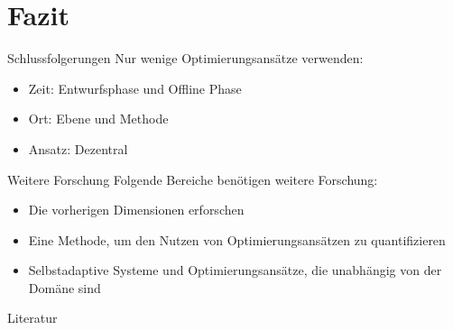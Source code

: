 \documentclass[de,16:9]{sdqbeamer}
\begin{document}
\section{Fazit}

\begin{frame}{Schlussfolgerungen}
	Nur wenige Optimierungsansätze verwenden:
	\begin{itemize}
		\item Zeit: Entwurfsphase und Offline Phase
		\item Ort: Ebene und Methode
		\item Ansatz: Dezentral
	\end{itemize}
\end{frame}

\begin{frame}{Weitere Forschung}
	Folgende Bereiche benötigen weitere Forschung:
	\begin{itemize}
		\item Die vorherigen Dimensionen erforschen
		\item Eine Methode, um den Nutzen von Optimierungsansätzen zu quantifizieren
		\item Selbstadaptive Systeme und Optimierungsansätze, die unabhängig von der Domäne sind
	\end{itemize}
\end{frame}

\appendix
\beginbackup

\begin{frame}[allowframebreaks]{Literatur}
\printbibliography
\end{frame}

\backupend
\end{document}
